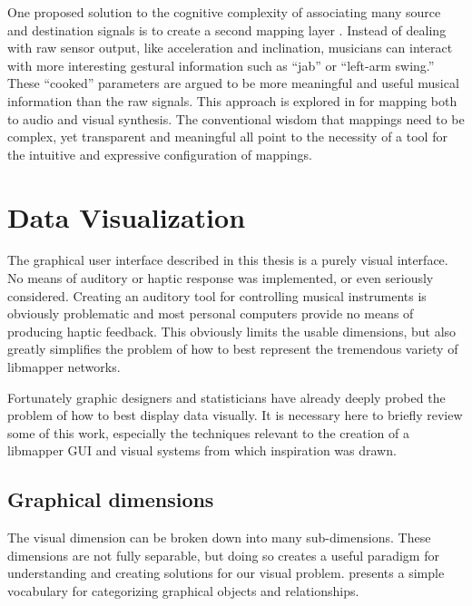 One proposed solution to the cognitive complexity of associating many source and destination signals is to create a second mapping layer . Instead of dealing with raw sensor output, like acceleration and inclination, musicians can interact with more interesting gestural information such as ``jab'' or ``left-arm swing.'' These ``cooked'' parameters are argued to be more meaningful and useful musical information than the raw signals. This approach is explored in  for mapping both to audio and visual synthesis. The conventional wisdom that mappings need to be complex, yet transparent and meaningful all point to the necessity of a tool for the intuitive and expressive configuration of mappings.


\section{Data Visualization}
\label{sec:data_viz}

The graphical user interface described in this thesis is a purely visual interface. No means of auditory or haptic response was implemented, or even seriously considered. Creating an auditory tool for controlling musical instruments is obviously problematic and most personal computers provide no means of producing haptic feedback. This obviously limits the usable dimensions, but also greatly simplifies the problem of how to best represent the tremendous variety of libmapper networks.

Fortunately graphic designers and statisticians have already deeply probed the problem of how to best display data visually. It is necessary here to briefly review some of this work, especially the techniques relevant to the creation of a libmapper GUI and visual systems from which inspiration was drawn.

\subsection{Graphical dimensions}

The visual dimension can be broken down into many sub-dimensions. These dimensions are not fully separable, but doing so creates a useful paradigm for understanding and creating solutions for our visual problem.  presents a simple vocabulary for categorizing graphical objects and relationships.

